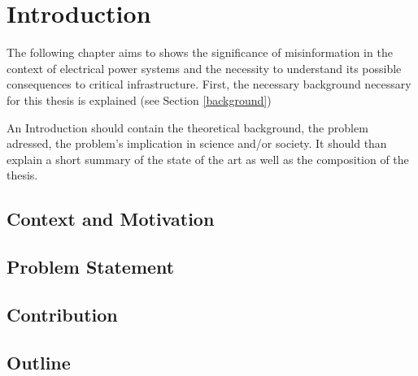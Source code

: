 \chapter{Introduction}

The following chapter aims to
shows the significance of misinformation in the context of
electrical power systems and the necessity to understand its
possible consequences to critical infrastructure. 
First, the necessary background necessary for this thesis is explained
(see Section \ref{background})

An Introduction should contain the theoretical background, 
the problem adressed, the problem's implication in science and/or society. 
It should than explain a short summary of the state of the art  as well 
as the composition of the thesis.

\section{Context and Motivation}

\section{Problem Statement}
\section{Contribution}
\section{Outline}